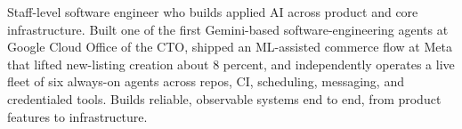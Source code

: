 


Staff-level software engineer who builds applied AI across product and core infrastructure. Built one of the first Gemini-based software-engineering agents at Google Cloud Office of the CTO, shipped an ML-assisted commerce flow at Meta that lifted new-listing creation about 8 percent, and independently operates a live fleet of six always-on agents across repos, CI, scheduling, messaging, and credentialed tools. Builds reliable, observable systems end to end, from product features to infrastructure.







